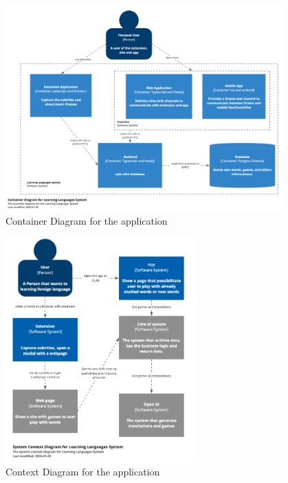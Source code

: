\documentclass[12pt]{article}
\begin{document}
\begin{figure}[!h]
  \centering
  \caption{
    Container Diagram for the application
  }
  \label{fig:container_diagram}
  \includegraphics[width=0.95\textwidth]{assets/24.png}
\end{figure}
\begin{figure}[!h]
\centering
\caption{
Context Diagram for the application
}
\label{fig:context_diagram}
\includegraphics[width=0.65\textwidth]{assets/4.png}
\end{figure}
\end{document}
